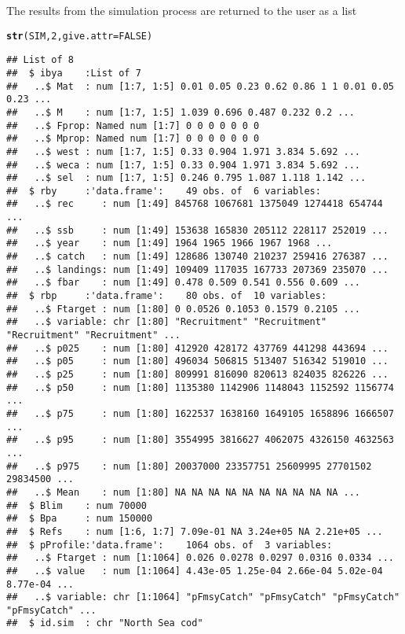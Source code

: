 \documentclass[a4paper]{article}\usepackage{graphicx, color}
\makeatletter
\newcommand{\hlfunctioncall}[1]{\textcolor[rgb]{0.501960784313725,0,0.329411764705882}{\textbf{#1}}}%
\newenvironment{kframe}{%
 \def\at@end@of@kframe{}%
 \ifinner\ifhmode%
  \def\at@end@of@kframe{\end{minipage}}%
  \begin{minipage}{\columnwidth}%
 \fi\fi%
 \def\FrameCommand##1{\hskip\@totalleftmargin \hskip-\fboxsep
 \colorbox{shadecolor}{##1}\hskip-\fboxsep
     \hskip-\linewidth \hskip-\@totalleftmargin \hskip\columnwidth}%
 \MakeFramed {\advance\hsize-\width
   \@totalleftmargin\z@ \linewidth\hsize
   \@setminipage}}%
 {\par\unskip\endMakeFramed%
 \at@end@of@kframe}
\newenvironment{knitrout}{}{} %
\makeatother
\begin{document}
The results from the simulation process are returned to the user as a list
\begin{knitrout}
\color{fgcolor}\begin{kframe}
\begin{alltt}
\hlfunctioncall{str}(SIM, 2, give.attr = FALSE)
\end{alltt}
\begin{verbatim}
## List of 8
##  $ ibya    :List of 7
##   ..$ Mat  : num [1:7, 1:5] 0.01 0.05 0.23 0.62 0.86 1 1 0.01 0.05 0.23 ...
##   ..$ M    : num [1:7, 1:5] 1.039 0.696 0.487 0.232 0.2 ...
##   ..$ Fprop: Named num [1:7] 0 0 0 0 0 0 0
##   ..$ Mprop: Named num [1:7] 0 0 0 0 0 0 0
##   ..$ west : num [1:7, 1:5] 0.33 0.904 1.971 3.834 5.692 ...
##   ..$ weca : num [1:7, 1:5] 0.33 0.904 1.971 3.834 5.692 ...
##   ..$ sel  : num [1:7, 1:5] 0.246 0.795 1.087 1.118 1.142 ...
##  $ rby     :'data.frame':	49 obs. of  6 variables:
##   ..$ rec     : num [1:49] 845768 1067681 1375049 1274418 654744 ...
##   ..$ ssb     : num [1:49] 153638 165830 205112 228117 252019 ...
##   ..$ year    : num [1:49] 1964 1965 1966 1967 1968 ...
##   ..$ catch   : num [1:49] 128686 130740 210237 259416 276387 ...
##   ..$ landings: num [1:49] 109409 117035 167733 207369 235070 ...
##   ..$ fbar    : num [1:49] 0.478 0.509 0.541 0.556 0.609 ...
##  $ rbp     :'data.frame':	80 obs. of  10 variables:
##   ..$ Ftarget : num [1:80] 0 0.0526 0.1053 0.1579 0.2105 ...
##   ..$ variable: chr [1:80] "Recruitment" "Recruitment" "Recruitment" "Recruitment" ...
##   ..$ p025    : num [1:80] 412920 428172 437769 441298 443694 ...
##   ..$ p05     : num [1:80] 496034 506815 513407 516342 519010 ...
##   ..$ p25     : num [1:80] 809991 816090 820613 824035 826226 ...
##   ..$ p50     : num [1:80] 1135380 1142906 1148043 1152592 1156774 ...
##   ..$ p75     : num [1:80] 1622537 1638160 1649105 1658896 1666507 ...
##   ..$ p95     : num [1:80] 3554995 3816627 4062075 4326150 4632563 ...
##   ..$ p975    : num [1:80] 20037000 23357751 25609995 27701502 29834500 ...
##   ..$ Mean    : num [1:80] NA NA NA NA NA NA NA NA NA NA ...
##  $ Blim    : num 70000
##  $ Bpa     : num 150000
##  $ Refs    : num [1:6, 1:7] 7.09e-01 NA 3.24e+05 NA 2.21e+05 ...
##  $ pProfile:'data.frame':	1064 obs. of  3 variables:
##   ..$ Ftarget : num [1:1064] 0.026 0.0278 0.0297 0.0316 0.0334 ...
##   ..$ value   : num [1:1064] 4.43e-05 1.25e-04 2.66e-04 5.02e-04 8.77e-04 ...
##   ..$ variable: chr [1:1064] "pFmsyCatch" "pFmsyCatch" "pFmsyCatch" "pFmsyCatch" ...
##  $ id.sim  : chr "North Sea cod"
\end{verbatim}
\end{kframe}
\end{knitrout}
\end{document}
